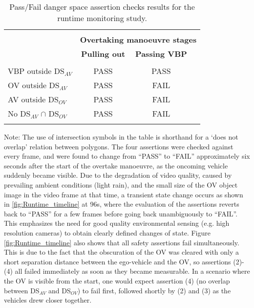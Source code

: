 \begin{table}[h]
	\centering
	\begin{tabular}{ lccc }
		\hline
		\\
		\multirow{3}{*}{\textbf{}} & \multicolumn{3}{c}{\textbf{Overtaking manoeuvre stages}}\\
		\textbf{Assertion} & \textbf{Pulling out} & \textbf{Passing VBP} & %
		 \\
		&  &  &  \\
		VBP outside DS$_{AV}$ & PASS & PASS & \\
		OV outside DS$_{AV}$ & PASS & FAIL & \\
		AV outside DS$_{OV}$  & PASS & FAIL & \\
		No DS$_{AV}$ $\cap$ DS$_{OV}$  & PASS & FAIL & \\
		\\
		\hline
	\end{tabular}
	\caption{Pass/Fail danger space assertion checks results for the runtime monitoring study. } \label{Overtaking_DS_table}
\end{table}
Note: The use of intersection symbols in the table is shorthand for a `does not overlap' relation between polygons. 
The four assertions were checked against every frame, and were found to change from ``PASS'' to ``FAIL'' approximately six seconds after the start of the overtake manoeuvre, as the oncoming vehicle suddenly became visible. Due to the degradation of video quality, caused by prevailing ambient conditions (light rain), and the small size of the OV object image in the video frame at that time, a transient state change occurs as shown in \ref{fig:Runtime_timeline} at 96s, where the evaluation of the assertions reverts back to ``PASS'' for a few frames before going back unambiguously to ``FAIL''. This emphasizes the need for good quality environmental sensing (e.g. high resolution cameras) to obtain clearly defined changes of state. Figure \ref{fig:Runtime_timeline} also shows that all safety assertions fail simultaneously. This is due to the fact that the obscuration of the OV was cleared with only a short separation distance between the ego-vehicle and the OV, so assertions (2)-(4) all failed immediately as soon as they became measurable. In a scenario where the OV is visible from the start, one would expect assertion (4) (no overlap between DS$_{AV}$ and DS$_{OV}$) to fail first, followed shortly by (2) and (3) as the vehicles drew closer together.

